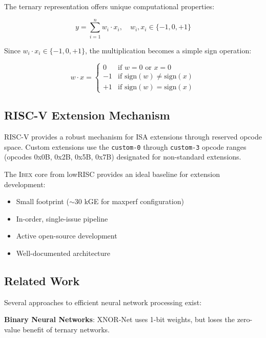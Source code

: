 \documentclass[conference,10pt]{IEEEtran}
\newcommand{\ibex}{\textsc{Ibex}}
\newcommand{\riscv}{RISC-V}
\begin{document}
The ternary representation offers unique computational properties:

\begin{equation}
y = \sum_{i=1}^{n} w_i \cdot x_i, \quad w_i, x_i \in \{-1, 0, +1\}
\label{eq:ternary_mac}
\end{equation}

Since $w_i \cdot x_i \in \{-1, 0, +1\}$, the multiplication becomes a simple sign operation:

\begin{equation}
w \cdot x = \begin{cases}
0 & \text{if } w = 0 \text{ or } x = 0 \\
-1 & \text{if } \text{sign}(w) \neq \text{sign}(x) \\
+1 & \text{if } \text{sign}(w) = \text{sign}(x)
\end{cases}
\end{equation}

\subsection{RISC-V Extension Mechanism}

\riscv{} provides a robust mechanism for ISA extensions through reserved opcode space. Custom extensions use the \texttt{custom-0} through \texttt{custom-3} opcode ranges (opcodes 0x0B, 0x2B, 0x5B, 0x7B) designated for non-standard extensions.

The \ibex{} core from lowRISC provides an ideal baseline for extension development:

\begin{itemize}
    \item Small footprint ($\sim$30 kGE for maxperf configuration)
    \item In-order, single-issue pipeline
    \item Active open-source development
    \item Well-documented architecture
\end{itemize}

\subsection{Related Work}

Several approaches to efficient neural network processing exist:

\textbf{Binary Neural Networks}: XNOR-Net \cite{rastegari2016xnor} uses 1-bit weights, but loses the zero-value benefit of ternary networks.
\end{document}

